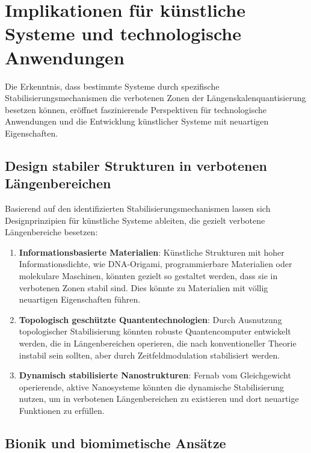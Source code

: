 \documentclass[12pt,a4paper]{article}
\begin{document}
	\section{Implikationen für künstliche Systeme und technologische Anwendungen}
	\label{sec:technologische_anwendungen}
	
	Die Erkenntnis, dass bestimmte Systeme durch spezifische Stabilisierungs\-mechanismen die \glqq verbotenen Zonen\grqq{} der Längen\-skalen\-quantisierung besetzen können, eröffnet faszinierende Perspektiven für technologische Anwendungen und die Entwicklung künstlicher Systeme mit neuartigen Eigenschaften.
	
	\subsection{Design stabiler Strukturen in verbotenen Längenbereichen}
	\label{subsec:design_stabile_strukturen}
	
	Basierend auf den identifizierten Stabilisierungs\-mechanismen lassen sich Designprinzipien für künstliche Systeme ableiten, die gezielt verbotene Längen\-bereiche besetzen:
	
	\begin{enumerate}
		\item \textbf{Informationsbasierte Materialien}: Künstliche Strukturen mit hoher Informationsdichte, wie DNA-Origami, programmierbare Materialien oder molekulare Maschinen, könnten gezielt so gestaltet werden, dass sie in verbotenen Zonen stabil sind. Dies könnte zu Materialien mit völlig neuartigen Eigenschaften führen.
		
		\item \textbf{Topologisch geschützte Quantentechnologien}: Durch Ausnutzung topologischer Stabilisierung könnten robuste Quantencomputer entwickelt werden, die in Längen\-bereichen operieren, die nach konventioneller Theorie instabil sein sollten, aber durch Zeitfeldmodulation stabilisiert werden.
		
		\item \textbf{Dynamisch stabilisierte Nanostrukturen}: Fernab vom Gleichgewicht operierende, aktive Nanosysteme könnten die dynamische Stabilisierung nutzen, um in verbotenen Längen\-bereichen zu existieren und dort neuartige Funktionen zu erfüllen.
	\end{enumerate}
	
	\subsection{Bionik und biomimetische Ansätze}
	\label{subsec:bionik}
	
\end{document}
